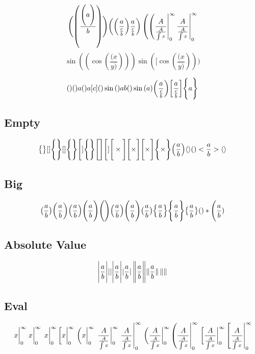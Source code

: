\documentclass{article}
\begin{document}
\[
  \pqty\Bigg{\pqty{\frac{\pqty\Bigg{a}}{b}}}
  \qty(  \qty(\frac{a}{\frac{c}{b}})\frac{a}{\frac{c}{b}})
    \eval(  \eval(\frac{A}{\frac{A}{\int x}}|_0^\infty\frac{A}{\frac{A}{\int x}}|_0^\infty
  \]
\[
  \sin((\cos({\frac{(x}{y)}})))
  \sin([\cos({\frac{(x}{y)}})))
\]



\[
  \quantity
  \quantity a
  \quantity\bigg a
  \quantity[c]
  \quantity\sin
  \qty\Bigg ab
  \quantity\bigg\sin
  \qty(a)
  \qty(\frac{a}{\frac{c}{b}})
  \qty[\frac{a}{\frac{c}{b}}]
  \qty\Bigg{a}
\]

\subsection*{Empty}

\[
  \qty\big{}[]
  \qty\Bigg{}[]
  \qty\Bigg{}\Bigg[]
  \qty\Bigg{}\qty\Bigg[]
  \Bigg[]
  \Bigg[ \times \Bigg]
  \Biggl[ \times \Biggr]
  \qty\Bigg[\times]
  \qty\Bigg{\times}
  \qty(\frac{a}{b})\langle\rangle
  \qty<\frac{a}{b}>\langle\rangle
\]

\subsection*{Big}

\[
  \quantity\big(\frac{a}{b})
  \quantity\bigg(\frac{a}{b})
  \quantity\Big(\frac{a}{b})
  \quantity\Bigg(\frac{a}{b})
  \pqty\Bigg{} 
  \pqty{\frac{a}{b}}
  \pqty\Bigg{\frac{a}{b}}
  \pqty\big{\frac{a}{b}}
  \Bqty{\frac{a}{b}}
  \Bqty\Bigg{\frac{a}{b}}
  \Bqty\big{\frac{a}{b}}
  \quantity*\Bigg(\frac{a}{b})
\]

\subsection*{Absolute Value}
\[
  \absolutevalue\Bigg{\frac{a}{b}}
  \absolutevalue{}
  \abs\Bigg{\frac{a}{b}}
  \abs*\Bigg{\frac{a}{b}}
  \norm\Bigg{\frac{a}{b}}
  \norm*\Bigg{\frac{a}{b}}
  \norm{}
\]


\newpage
\subsection*{Eval}

\[
  \evaluated{x}_0^\infty
  \eval{x}_0^\infty
  \eval*{x}_0^\infty
  \eval[x|_0^\infty
  \eval*(x|_0^\infty
  \eval*{\frac{A}{\frac{A}{\int x}}}_0^\infty
  \eval{\frac{A}{\frac{A}{\int x}}}_0^\infty
  \eval*(\frac{A}{\frac{A}{\int x}}|_0^\infty
  \eval(\frac{A}{\frac{A}{\int x}}|_0^\infty
  \eval*[\frac{A}{\frac{A}{\int x}}|_0^\infty
  \eval[\frac{A}{\frac{A}{\int x}}|_0^\infty
\]
\end{document}
